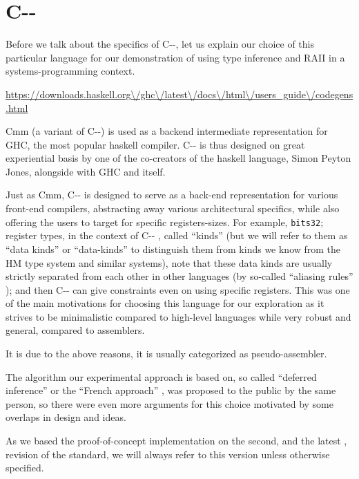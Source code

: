 
\providecommand{\cmm}[0]{C-{}- }

\chapter{C-{}-}


Before we talk about the specifics of C-{}-, let us explain our choice of this particular language for our demonstration of using type inference and RAII in a systems-programming context.

\url{https://downloads.haskell.org\/ghc\/latest\/docs\/html\/users_guide\/codegens.html}


Cmm (a variant of C-{}-) is used as a backend intermediate representation for GHC, the most popular haskell compiler. C-{}- is thus designed on great experiential basis by one of the co-creators of the haskell language, Simon Peyton Jones, alongside with GHC and itself.

Just as Cmm, \cmm is designed to serve as a back-end representation for various front-end compilers, abstracting away various architectural specifics, while also offering the users to target for specific registers-sizes. For example, \lstinline{bits32}; register types, in the context of \cmm, called ``kinds'' (but we will refer to them as ``data kinds'' or ``data-kinds'' to distinguish them from kinds we know from the HM type system and similar systems), note that these data kinds are usually strictly separated from each other in other languages (by so-called ``aliasing rules'' ); and then \cmm can give constraints even on using specific registers. This was one of the main motivations for choosing this language for our exploration as it strives to be minimalistic compared to high-level languages while very robust and general, compared to assemblers.

It is due to the above reasons, it is usually categorized as pseudo-assembler.

The algorithm our experimental approach is based on, so called ``deferred inference'' or the ``French approach'' , was proposed to the public by the same person, so there were even more arguments for this choice motivated by some overlaps in design and ideas. 

As we based the proof-of-concept implementation on the second, and the latest , revision of the standard, we will always refer to this version unless otherwise specified.

